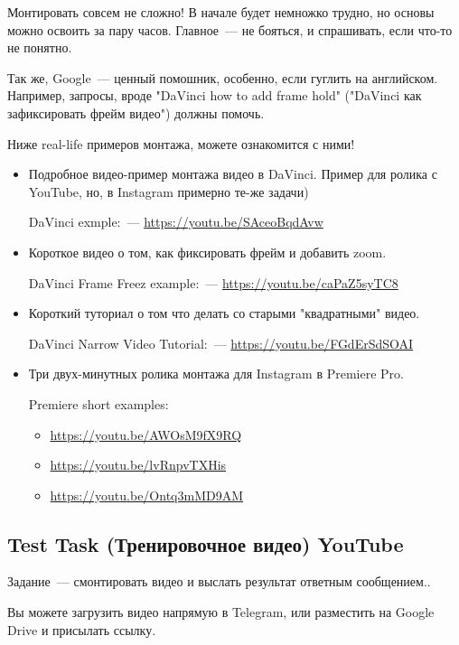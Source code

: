 \documentclass[
a4paper, %
12pt, %
article,
onecolumn, %
openany, %
]{memoir}
\begin{document}
Монтировать совсем не сложно! В начале будет немножко трудно, но основы можно 
освоить за пару часов. Главное~--- не бояться, и спрашивать, если что-то не понятно.

Так же, Google~--- ценный помошник, особенно, если гуглить на английском.
Например, запросы, вроде 
"DaVinci how to add frame hold" ("DaVinci как зафиксировать фрейм видео")
должны помочь.

Ниже real-life примеров монтажа, можете ознакомится с ними!
\begin{itemize}
    \item Подробное видео-пример монтажа видео в DaVinci. 
        Пример для ролика с YouTube, но, в 
        Instagram примерно те-же задачи)
        
        DaVinci exmple:~--- \href{https://youtu.be/SAceoBqdAvw}{https://youtu.be/SAceoBqdAvw}
    \item Короткое видео о том, как фиксировать фрейм и добавить zoom.

        DaVinci Frame Freez example:~--- \href{https://youtu.be/caPaZ5syTC8}{https://youtu.be/caPaZ5syTC8}
    \item Короткий туториал о том что делать со старыми "квадратными" видео. 

        DaVinci Narrow Video Tutorial:~--- \href{https://youtu.be/FGdErSdSOAI}{https://youtu.be/FGdErSdSOAI}

\item Три двух-минутных ролика монтажа для Instagram в Premiere Pro.

    Premiere short examples:
    \begin{itemize}
        \item \href{https://youtu.be/AWOsM9fX9RQ}{https://youtu.be/AWOsM9fX9RQ}
        \item \href{https://youtu.be/lvRnpvTXHis}{https://youtu.be/lvRnpvTXHis}
        \item \href{https://youtu.be/Ontq3mMD9AM}{https://youtu.be/Ontq3mMD9AM}
    \end{itemize}
\end{itemize}


\subsection{Test Task (Тренировочное видео) YouTube}
 
Задание~--- смонтировать видео и выслать результат
ответным сообщением.. 

Вы можете загрузить видео напрямую в Telegram, или разместить
на Google Drive и присылать ссылку.
\end{document}
